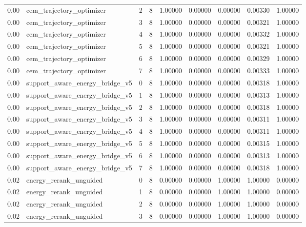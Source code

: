 \documentclass{article}
\begin{document}
\begin{table}[tbp]
{\begin{tabular}{lllllllll}
0.00 & cem\_trajectory\_optimizer & 2 & 8 & 1.00000 & 0.00000 & 0.00000 & 0.00330 & 1.00000 \\
0.00 & cem\_trajectory\_optimizer & 3 & 8 & 1.00000 & 0.00000 & 0.00000 & 0.00321 & 1.00000 \\
0.00 & cem\_trajectory\_optimizer & 4 & 8 & 1.00000 & 0.00000 & 0.00000 & 0.00332 & 1.00000 \\
0.00 & cem\_trajectory\_optimizer & 5 & 8 & 1.00000 & 0.00000 & 0.00000 & 0.00321 & 1.00000 \\
0.00 & cem\_trajectory\_optimizer & 6 & 8 & 1.00000 & 0.00000 & 0.00000 & 0.00329 & 1.00000 \\
0.00 & cem\_trajectory\_optimizer & 7 & 8 & 1.00000 & 0.00000 & 0.00000 & 0.00333 & 1.00000 \\
0.00 & support\_aware\_energy\_bridge\_v5 & 0 & 8 & 1.00000 & 0.00000 & 0.00000 & 0.00318 & 1.00000 \\
0.00 & support\_aware\_energy\_bridge\_v5 & 1 & 8 & 1.00000 & 0.00000 & 0.00000 & 0.00313 & 1.00000 \\
0.00 & support\_aware\_energy\_bridge\_v5 & 2 & 8 & 1.00000 & 0.00000 & 0.00000 & 0.00318 & 1.00000 \\
0.00 & support\_aware\_energy\_bridge\_v5 & 3 & 8 & 1.00000 & 0.00000 & 0.00000 & 0.00311 & 1.00000 \\
0.00 & support\_aware\_energy\_bridge\_v5 & 4 & 8 & 1.00000 & 0.00000 & 0.00000 & 0.00311 & 1.00000 \\
0.00 & support\_aware\_energy\_bridge\_v5 & 5 & 8 & 1.00000 & 0.00000 & 0.00000 & 0.00315 & 1.00000 \\
0.00 & support\_aware\_energy\_bridge\_v5 & 6 & 8 & 1.00000 & 0.00000 & 0.00000 & 0.00313 & 1.00000 \\
0.00 & support\_aware\_energy\_bridge\_v5 & 7 & 8 & 1.00000 & 0.00000 & 0.00000 & 0.00318 & 1.00000 \\
0.02 & energy\_rerank\_unguided & 0 & 8 & 0.00000 & 0.00000 & 1.00000 & 1.00000 & 0.00000 \\
0.02 & energy\_rerank\_unguided & 1 & 8 & 0.00000 & 0.00000 & 1.00000 & 1.00000 & 0.00000 \\
0.02 & energy\_rerank\_unguided & 2 & 8 & 0.00000 & 0.00000 & 1.00000 & 1.00000 & 0.00000 \\
0.02 & energy\_rerank\_unguided & 3 & 8 & 0.00000 & 0.00000 & 1.00000 & 1.00000 & 0.00000 \\
\bottomrule
\end{tabular}
}
\end{table}
\end{document}
